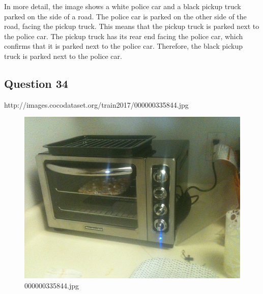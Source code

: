 \begin{enumerate}
        In more detail, the image shows a white police car and a black pickup truck parked on the side of a road. The police car is parked on the other side of the road, facing the pickup truck. This means that the pickup truck is parked next to the police car. The pickup truck has its rear end facing the police car, which confirms that it is parked next to the police car. Therefore, the black pickup truck is parked next to the police car.
    \end{enumerate}
    \subsection*{Question 34}
    http://images.cocodataset.org/train2017/000000335844.jpg
    \begin{figure}[h]
        \centering
        \includegraphics[width=0.8\linewidth]{../image set/easy/000000335844.jpg}
        \caption{000000335844.jpg}
    \end{figure}
